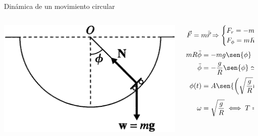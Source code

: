 \documentclass[serif]{beamer}
\begin{document}
\begin{frame}
\begin{block}{Dinámica de un movimiento circular}
\begin{columns}[c]
	\begin{column}{0.35\textwidth}
		\includegraphics[width=\textwidth]{taylor1_14}
	\end{column}
  \begin{column}{0.65\textwidth}
		\[
			\vec{F}= m \ddot{\vec{r}} \Rightarrow
			\begin{cases}
				F_r = -m R \dot{\phi}^2= m g \cos{\phi} - N \\
				F_\phi = m R \ddot{\phi}= -m g \sen{\phi}
			\end{cases}
		\]
		\pause
		\begin{align*}
			m R \ddot{\phi} & = -m g \sen{\phi} \\
			\ddot{\phi} & = - \frac{g}{R} \sen{\phi} \simeq - \frac{g}{R} \phi\, (\phi \simeq 0)\\
			\phi(t) & = A \sen{\left( \sqrt{\frac{g}{R}} t \right) }+ B \cos(\sqrt{\frac{g}{R}} t) \\
			\omega & =  \sqrt{\frac{g}{R}} \iff T = \frac{2\pi}{\omega}= 2\pi \sqrt{\frac{R}{g}}  
		\end{align*}
	\end{column}
\end{columns}
\end{block}
\end{frame}
\end{document}
